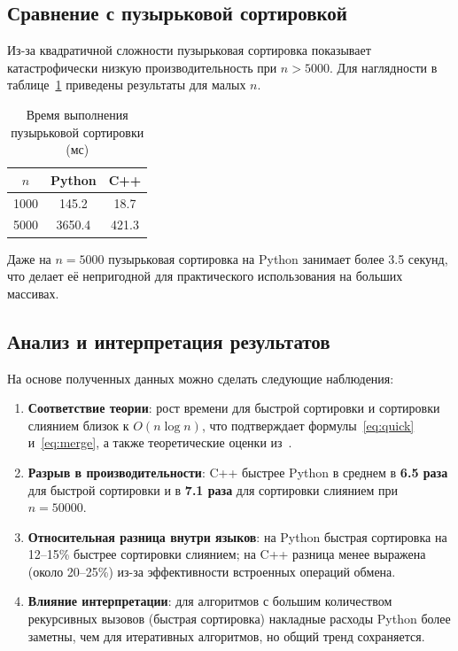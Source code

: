 \subsection{Сравнение с пузырьковой сортировкой}

Из-за квадратичной сложности пузырьковая сортировка показывает катастрофически низкую производительность при $n > 5000$. Для наглядности в таблице~\ref{tab:bubble} приведены результаты для малых $n$.

\begin{table}[H]
\centering
\caption{Время выполнения пузырьковой сортировки (мс)}
\label{tab:bubble}
\begin{tabular}{|c|c|c|}
\hline
\textbf{$n$} & \textbf{Python} & \textbf{C++} \\
\hline
1000 & 145.2 & 18.7 \\
\hline
5000 & 3650.4 & 421.3 \\
\hline
\end{tabular}
\end{table}

Даже на $n=5000$ пузырьковая сортировка на Python занимает более 3.5 секунд, что делает её непригодной для практического использования на больших массивах.

\subsection{Анализ и интерпретация результатов}

На основе полученных данных можно сделать следующие наблюдения:

\begin{enumerate}
    \item \textbf{Соответствие теории}: рост времени для быстрой сортировки и сортировки слиянием близок к $O(n \log n)$, что подтверждает формулы~\ref{eq:quick} и~\ref{eq:merge}, а также теоретические оценки из~\cite{cormen2009}.
    \item \textbf{Разрыв в производительности}: C++ быстрее Python в среднем в \textbf{6.5 раза} для быстрой сортировки и в \textbf{7.1 раза} для сортировки слиянием при $n=50000$.
    \item \textbf{Относительная разница внутри языков}: на Python быстрая сортировка на 12–15\% быстрее сортировки слиянием; на C++ разница менее выражена (около 20–25\%) из-за эффективности встроенных операций обмена.
    \item \textbf{Влияние интерпретации}: для алгоритмов с большим количеством рекурсивных вызовов (быстрая сортировка) накладные расходы Python более заметны, чем для итеративных алгоритмов, но общий тренд сохраняется.
\end{enumerate}

